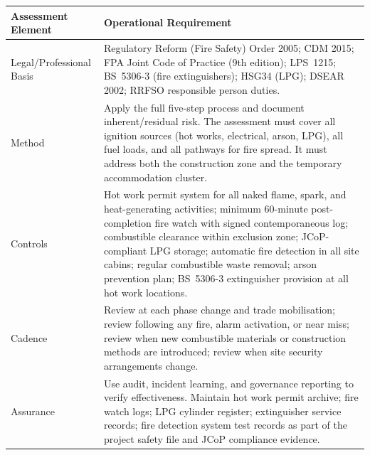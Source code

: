\begin{table}[H]
\centering
\begin{tabularx}{\textwidth}{>{\raggedright\arraybackslash}p{3.2cm}X}
\toprule
\textbf{Assessment Element} & \textbf{Operational Requirement} \\
\midrule
Legal/Professional Basis & Regulatory Reform (Fire Safety) Order 2005; CDM 2015; FPA Joint Code of Practice (9th edition); LPS~1215; BS~5306-3 (fire extinguishers); HSG34 (LPG); DSEAR 2002; RRFSO responsible person duties. \\
Method & Apply the full five-step process and document inherent/residual risk. The assessment must cover all ignition sources (hot works, electrical, arson, LPG), all fuel loads, and all pathways for fire spread. It must address both the construction zone and the temporary accommodation cluster. \\
Controls & Hot work permit system for all naked flame, spark, and heat-generating activities; minimum 60-minute post-completion fire watch with signed contemporaneous log; combustible clearance within exclusion zone; JCoP-compliant LPG storage; automatic fire detection in all site cabins; regular combustible waste removal; arson prevention plan; BS~5306-3 extinguisher provision at all hot work locations. \\
Cadence & Review at each phase change and trade mobilisation; review following any fire, alarm activation, or near miss; review when new combustible materials or construction methods are introduced; review when site security arrangements change. \\
Assurance & Use audit, incident learning, and governance reporting to verify effectiveness. Maintain hot work permit archive; fire watch logs; LPG cylinder register; extinguisher service records; fire detection system test records as part of the project safety file and JCoP compliance evidence. \\
\bottomrule
\end{tabularx}
\end{table}

